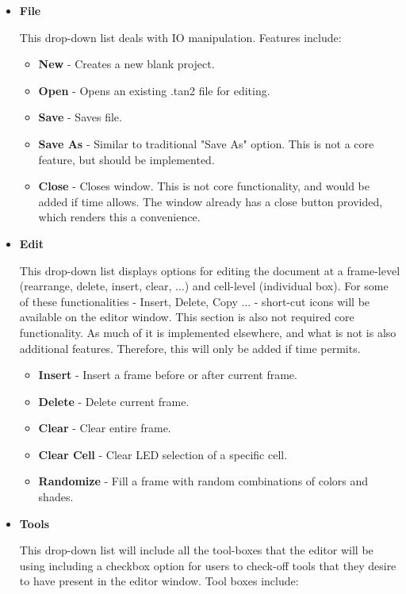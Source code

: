 \documentclass[]{article}
\begin{document}
\begin{itemize}
\item \textbf{File}

{This drop-down list deals with IO manipulation. Features include:}

	\begin{itemize}
	\item \textbf{New} - Creates a new blank project. 
	\item \textbf{Open} - Opens an existing .tan2 file for editing.
	\item \textbf{Save} - Saves file.
	\item \textbf{Save As} - Similar to traditional "Save As" option.  This is not a core feature, but should be implemented.
	\item \textbf{Close} - Closes window.   This is not core functionality, and would be added if time allows.  The window already has a close button provided, which renders this a convenience.


	\end{itemize}

\item \textbf{Edit}

{This drop-down list displays options for editing the document at a frame-level (rearrange, delete, insert, clear, ...) and cell-level (individual box). For some of these functionalities - Insert, Delete, Copy ... - short-cut icons will be available on the editor window.  This section is also not required core functionality.  As much of it is implemented elsewhere, and what is not is also additional features.  Therefore, this will only be added if time permits.}

	\begin{itemize}
	\item \textbf{Insert} - Insert a frame before or after current frame.
	\item \textbf{Delete} - Delete current frame.
	\item \textbf{Clear} - Clear entire frame.
	\item \textbf{Clear Cell} - Clear LED selection of a specific cell.
	\item \textbf{Randomize} - Fill a frame with random combinations of colors and shades.
	\end{itemize}

\item \textbf{Tools}

{This drop-down list will include all the tool-boxes that the editor will be using including a checkbox option for users to check-off tools that they desire to have present in the editor window. Tool boxes include:}


\end{itemize}
\end{document}
